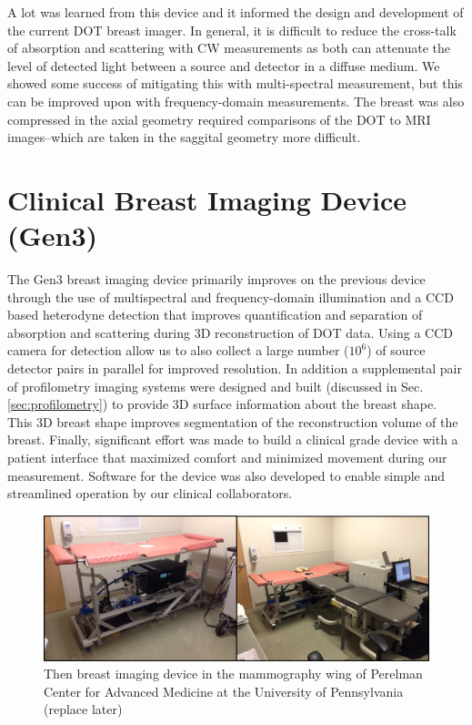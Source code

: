 A lot was learned from this device and it informed the design and development of the current DOT breast imager. In general, it is difficult to reduce the cross-talk of absorption and scattering with CW measurements as both can attenuate the level of detected light between a source and detector in a diffuse medium. We showed some success of mitigating this with multi-spectral measurement, but this can be improved upon with frequency-domain measurements. The breast was also compressed in the axial geometry required comparisons of the DOT to MRI images--which are taken in the saggital geometry more difficult.

\section{Clinical Breast Imaging Device (Gen3)}
The Gen3 breast imaging device primarily improves on the previous device through the use of multispectral and frequency-domain illumination and a CCD based heterodyne detection that  improves quantification and separation of absorption and scattering during 3D reconstruction of DOT data. Using a CCD camera for detection allow us to also collect a large number ($10^6$) of source detector pairs in parallel for improved resolution. In addition a supplemental pair of profilometry imaging systems were designed and built (discussed in Sec. \ref{sec:profilometry}) to provide 3D surface information about the breast shape. This 3D breast shape improves segmentation of the reconstruction volume of the breast. Finally, significant effort was made to build a clinical grade device with a patient interface that maximized comfort and minimized movement during our measurement. Software for the device was also developed to enable simple and streamlined operation by our clinical collaborators.
\begin{figure}[ht]
\begin{center}
\includegraphics[width=14.5cm]{./figures/4_Gen3/gen3pic3.png}
\caption{Then breast imaging device in the mammography wing of Perelman Center for Advanced Medicine at the University of Pennsylvania (replace later)}
\label{fig:gen3pic}
\end{center}
\end{figure}
